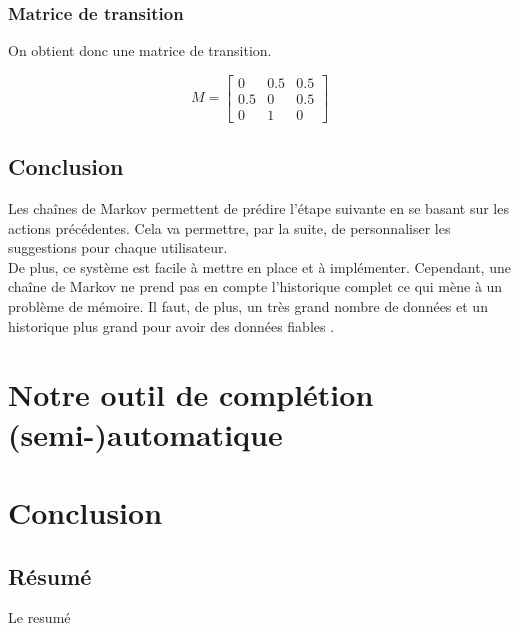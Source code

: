 \documentclass[a4paper, 11pt]{report}
\begin{document}
\subsection*{Matrice de transition}
On obtient donc une matrice de transition. 

\[
M =
\begin{bmatrix}
0 & 0.5 & 0.5 \\
0.5 & 0 & 0.5 \\
0 & 1 & 0
\end{bmatrix}
\]



\section{Conclusion}

Les chaînes de Markov permettent de prédire l'étape suivante en se basant sur les actions précédentes. Cela va permettre, par la suite, de personnaliser les suggestions pour chaque utilisateur. \\
De plus, ce système est facile à mettre en place et à implémenter. Cependant, une chaîne de Markov ne prend pas en compte l'historique complet ce qui mène à un problème de mémoire. Il faut, de plus, un très grand nombre de données et un historique plus grand pour avoir des données fiables .
\chapter{Notre outil de complétion (semi-)automatique}

\chapter*{Conclusion}
\newpage
\begin{center}
    \vspace*{\fill} %
    \section*{Résumé}
    \begin{justify}
Le resumé


    \end{justify}
\end{center}


\nocite{*}


\end{document}
